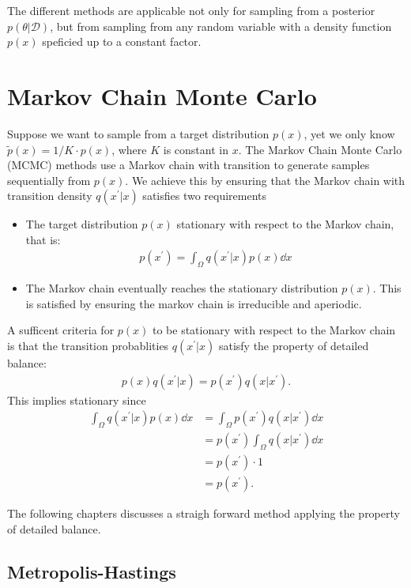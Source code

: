 The different methods are applicable not only for sampling from a posterior $p(\theta | \mathcal{D})$, but from sampling from any random variable with a density function $p(x)$ speficied up to a constant factor.

\section{Markov Chain Monte Carlo}
Suppose we want to sample from a target distribution $p(x)$, yet we only know $\tilde{p}(x) = 1/K\cdot p(x)$, where $K$ is constant in $x$.
The Markov Chain Monte Carlo (MCMC) methods use a Markov chain with transition to generate samples sequentially from $p(x)$. 
We achieve this by ensuring that the Markov chain with transition density $q(x^\prime | x)$ satisfies two requirements

\begin{itemize}
    \item The target distribution $p(x)$ stationary with respect to the Markov chain, that is:
    \begin{align} \label{eq:stationarity}
        p(x^\prime) = \int_{\Omega} q(x^\prime| x) p(x) \dd{x} 
    \end{align}
    \item The Markov chain eventually reaches the stationary distribution $p(x)$. This is satisfied by ensuring the markov chain is irreducible and aperiodic.

\end{itemize}
A sufficent criteria for $p(x)$ to be stationary with respect to the Markov chain is that the transition probablities $q(x^\prime|x)$ satisfy the property of detailed balance:
\begin{align*}
    p(x)q(x^\prime | x) = p(x^\prime)q(x| x^\prime).
\end{align*}
This implies stationary since
\begin{align*}
    \int_{\Omega} q(x^\prime | x) p(x) \dd{x} 
    &= \int_{\Omega}  p(x^\prime)q(x| x^\prime) \dd{x} \\ 
    &=  p(x^\prime) \int_{\Omega} q(x| x^\prime) \dd{x} \\
    &=  p(x^\prime) \cdot 1 \\
    &= p(x^\prime).
\end{align*}

The following chapters discusses a straigh forward method applying the property of detailed balance.

\subsection{Metropolis-Hastings}


